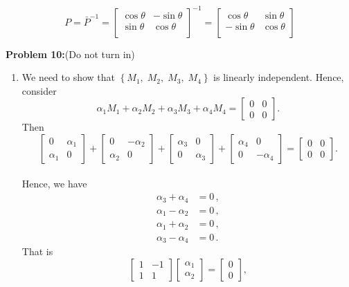 \documentclass[letterpaper]{article}
\begin{document}
$$P=\bar{P}^{-1}=\begin{bmatrix} \cos\theta & -\sin\theta \\\sin\theta & \cos\theta \\\end{bmatrix}^{-1} = \begin{bmatrix} \cos\theta & \sin\theta \\-\sin\theta & \cos\theta \\\end{bmatrix} $$


\noindent \textbf{Problem 10:}(Do not turn in)
\begin{enumerate}
\setlength{\itemsep}{.1in}
\renewcommand{\labelenumi}{(\alph{enumi})}
\item We need to show that $\left\lbrace M_1,\;M_2, \;M_3, \;M_4 \right\rbrace$ is linearly independent. Hence, consider
$$\alpha_1 M_1+\alpha_2 M_2 +\alpha_3 M_3+\alpha_4 M_4 = \left[\begin{array}{cc} 0&0\\0&0 \end{array}\right].$$
Then
$$\left[\begin{array}{cc} 0&\alpha_1\\\alpha_1&0 \end{array}\right]+\left[\begin{array}{cc} 0&-\alpha_2\\\alpha_2&0 \end{array}\right]+\left[\begin{array}{cc} \alpha_3&0\\0&\alpha_3 \end{array}\right]+\left[\begin{array}{cc} \alpha_4&0\\0&-\alpha_4 \end{array}\right]=\left[\begin{array}{cc} 0&0\\0&0 \end{array}\right].$$
\medskip\\
Hence, we have
$$\begin{aligned} \alpha_3+\alpha_4&=0\,,\\ \alpha_1-\alpha_2&=0\,,\\ \alpha_1+\alpha_2&=0\,,\\ \alpha_3-\alpha_4&=0\,. \end{aligned}$$
That is
$$\left[\begin{array}{cc}1&-1\\1&1\end{array}\right] \begin{bmatrix} \alpha_1\\\alpha_2 \end{bmatrix} = \begin{bmatrix} 0\\0 \end{bmatrix},$$

\end{enumerate}
\end{document}
